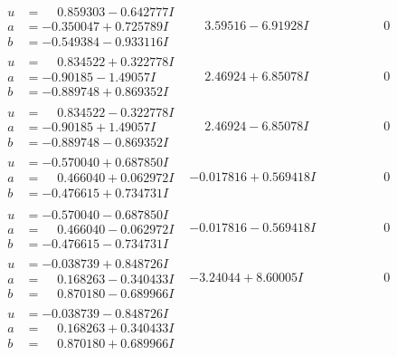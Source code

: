 \documentclass[1p]{elsarticle_modified}
\theoremstyle{definition}
\begin{document}
$$\begin{array}{c|c|c}
\begin{aligned}
u &= \phantom{-}0.859303 - 0.642777 I \\
a &= -0.350047 + 0.725789 I \\
b &= -0.549384 - 0.933116 I\end{aligned}
 & \phantom{-}3.59516 - 6.91928 I & \phantom{-0.000000 } 0 \\ \hline\begin{aligned}
u &= \phantom{-}0.834522 + 0.322778 I \\
a &= -0.90185 - 1.49057 I \\
b &= -0.889748 + 0.869352 I\end{aligned}
 & \phantom{-}2.46924 + 6.85078 I & \phantom{-0.000000 } 0 \\ \hline\begin{aligned}
u &= \phantom{-}0.834522 - 0.322778 I \\
a &= -0.90185 + 1.49057 I \\
b &= -0.889748 - 0.869352 I\end{aligned}
 & \phantom{-}2.46924 - 6.85078 I & \phantom{-0.000000 } 0 \\ \hline\begin{aligned}
u &= -0.570040 + 0.687850 I \\
a &= \phantom{-}0.466040 + 0.062972 I \\
b &= -0.476615 + 0.734731 I\end{aligned}
 & -0.017816 + 0.569418 I & \phantom{-0.000000 } 0 \\ \hline\begin{aligned}
u &= -0.570040 - 0.687850 I \\
a &= \phantom{-}0.466040 - 0.062972 I \\
b &= -0.476615 - 0.734731 I\end{aligned}
 & -0.017816 - 0.569418 I & \phantom{-0.000000 } 0 \\ \hline\begin{aligned}
u &= -0.038739 + 0.848726 I \\
a &= \phantom{-}0.168263 - 0.340433 I \\
b &= \phantom{-}0.870180 - 0.689966 I\end{aligned}
 & -3.24044 + 8.60005 I & \phantom{-0.000000 } 0 \\ \hline\begin{aligned}
u &= -0.038739 - 0.848726 I \\
a &= \phantom{-}0.168263 + 0.340433 I \\
b &= \phantom{-}0.870180 + 0.689966 I\end{aligned}

\end{array}$$
\end{document}
